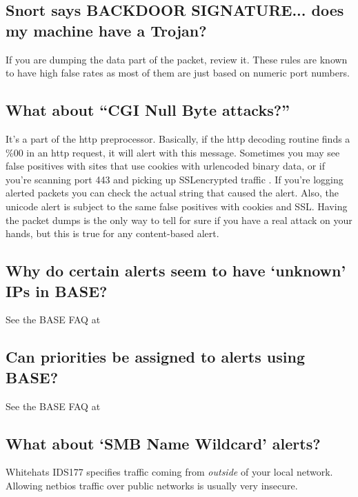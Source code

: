 \documentclass{article}
\begin{document}
\subsection{Snort says BACKDOOR SIGNATURE... does my machine have a Trojan? }

If you are dumping the data part of the packet, review it.
These rules are known to have high false rates as most of them
are just based on numeric port numbers.


\subsection{What about ``CGI Null Byte attacks?'' }

It's a part of the http preprocessor. Basically, if the http decoding 
routine finds a \%00 in an http request, it will alert with this message. 
Sometimes you may see false positives with sites that use cookies with
urlencoded binary data, or if you're scanning port 443 and picking up 
SSLencrypted  traffic . If you're logging alerted packets you can  check
the  actual string that caused the alert.  Also, the unicode alert is
subject to  the same false positives with cookies and SSL. Having the packet
dumps is the  only way to tell for sure if you have a real attack on your
hands, but this  is true for any content-based alert.

\subsection{Why do certain alerts seem to have `unknown' IPs in BASE?  }

See the BASE FAQ at 

\subsection{Can priorities be assigned to alerts using BASE?  }

See the BASE FAQ at 

\subsection{What about `SMB Name Wildcard' alerts? }

Whitehats IDS177
specifies traffic coming from {\em outside} of your local network.  Allowing
netbios traffic over public networks is usually very insecure.
\end{document}
